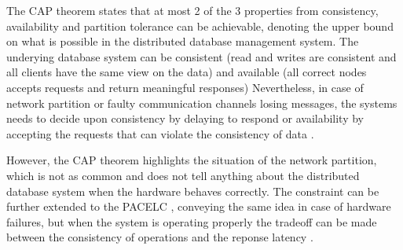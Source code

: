 The CAP theorem \cite{CAPTheorem} states that at most 2 of the 3 properties from consistency, availability and partition tolerance can be achievable, denoting the upper bound on what is possible in the distributed database management system. The underying database system can be consistent (read and writes are consistent and all clients have the same view on the data) and available (all correct nodes accepts requests and return meaningful responses) Nevertheless, in case of network partition or faulty communication channels losing messages, the systems needs to decide upon consistency by delaying to respond or availability by accepting the requests that can violate the consistency of data \cite{PerspectivesOnArchitectureEvolution}.

However, the CAP theorem highlights the situation of the network partition, which is not as common and does not tell anything about the distributed database system when the hardware behaves correctly. The constraint can be further extended to the PACELC \cite{PACELC}, conveying the same idea in case of hardware failures, but when the system is operating properly the tradeoff can be made between the consistency of operations and the reponse latency \cite{NoSQLDatabaseSystemsSurveyDecisionGuidance}.




